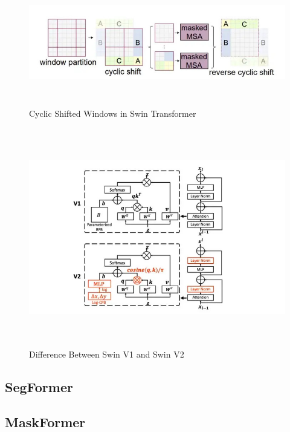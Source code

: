 \begin{figure}[ht]
\includegraphics[width=13.5cm, height=5.5cm]{images/swin-cyclic-shift.jpg}
\centering
\caption{Cyclic Shifted Windows in Swin Transformer}
\label{fig:swin cyclic}
\end{figure}

\FloatBarrier
\begin{figure}[ht]
\includegraphics[width=13.5cm, height=9.5cm]{images/swin1-vs-swin2.jpg}
\centering
\caption{Difference Between Swin V1 and Swin V2}
\label{fig:swin v1 vs v2}
\end{figure}
\FloatBarrier

\subsection{SegFormer}

\subsection{MaskFormer}

